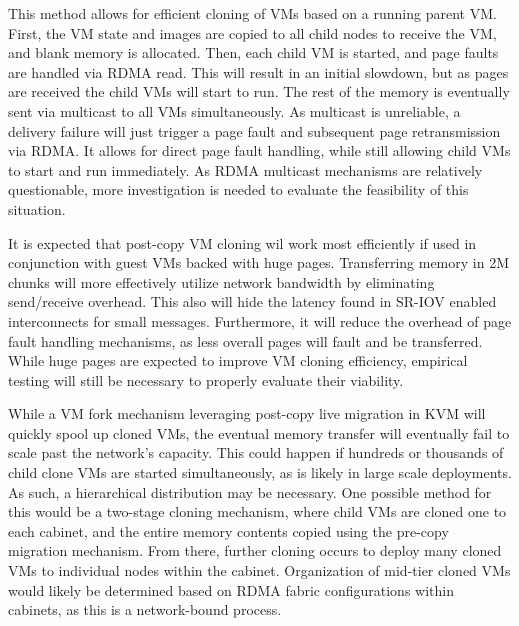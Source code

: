 This method allows for efficient cloning of VMs based on a running parent VM. First, the VM state and images are copied to all child nodes to receive the VM, and blank memory is allocated. Then, each child VM is started, and page faults are handled via RDMA read. This will result in an initial slowdown, but as pages are received the child VMs will start to run. The rest of the memory is eventually sent via multicast to all VMs simultaneously.   As multicast is unreliable, a delivery failure will just trigger a page fault and subsequent page retransmission via RDMA.  It allows for direct page fault handling, while still allowing child VMs to start and run immediately. As RDMA multicast mechanisms are relatively questionable,  more investigation is needed to evaluate the feasibility of this situation. %

It is expected that post-copy VM cloning wil work most efficiently if used in conjunction with guest VMs backed with huge pages. Transferring memory in 2M chunks will more effectively utilize network bandwidth by eliminating send/receive overhead. This also will hide the latency found in SR-IOV enabled interconnects for small messages. Furthermore, it will reduce the overhead of page fault handling mechanisms, as less overall pages will fault and be transferred.  While huge pages are expected to improve VM cloning efficiency, empirical testing will still be necessary to properly evaluate their viability.   

While a VM fork mechanism leveraging post-copy live migration in KVM will quickly spool up cloned VMs, the eventual memory transfer will eventually fail to scale past the network's capacity. This could happen if hundreds or thousands of child clone VMs are started simultaneously, as is likely in large scale deployments. As such, a hierarchical distribution may be necessary. One possible method for this would be a two-stage cloning mechanism, where child VMs are cloned one to each cabinet, and the entire memory contents copied using the pre-copy migration mechanism. From there, further cloning occurs to deploy many cloned VMs to individual nodes within the cabinet. Organization of mid-tier cloned VMs would likely be determined based on RDMA fabric configurations within cabinets, as this is a network-bound process. 





